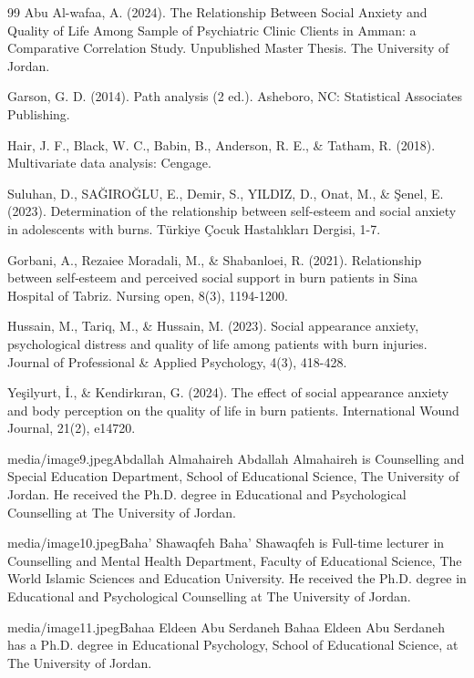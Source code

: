 \documentclass[10pt]{NSP1}
\begin{document}
\begin{thebibliography}{99}
Abu Al-wafaa, A. (2024). The Relationship Between Social Anxiety and Quality of Life Among Sample of Psychiatric Clinic Clients in Amman: a Comparative Correlation Study. Unpublished Master Thesis. The University of Jordan.

Garson, G. D. (2014). Path analysis (2 ed.). Asheboro, NC: Statistical Associates Publishing.

Hair, J. F., Black, W. C., Babin, B., Anderson, R. E., \& Tatham, R. (2018). Multivariate data analysis: Cengage.

Suluhan, D., SAĞIROĞLU, E., Demir, S., YILDIZ, D., Onat, M., \& Şenel, E. (2023). Determination of the relationship between self-esteem and social anxiety in adolescents with burns. Türkiye Çocuk Hastalıkları Dergisi, 1-7.

Gorbani, A., Rezaiee Moradali, M., \& Shabanloei, R. (2021). Relationship between self‐esteem and perceived social support in burn patients in Sina Hospital of Tabriz. Nursing open, 8(3), 1194-1200.

Hussain, M., Tariq, M., \& Hussain, M. (2023). Social appearance anxiety, psychological distress and quality of life among patients with burn injuries. Journal of Professional \& Applied Psychology, 4(3), 418-428.

Yeşilyurt, İ., \& Kendirkıran, G. (2024). The effect of social appearance anxiety and body perception on the quality of life in burn patients. International Wound Journal, 21(2), e14720.



\end{thebibliography}




\begin{biographyps}{media/image9.jpeg}{Abdallah Almahaireh}
Abdallah Almahaireh is Counselling and Special Education Department, School of Educational Science, The University of Jordan. He received the Ph.D. degree in Educational and Psychological Counselling at The University of Jordan.\end{biographyps}

\begin{biographyps}{media/image10.jpeg}{Baha' Shawaqfeh}
Baha' Shawaqfeh is Full-time lecturer in Counselling and Mental Health Department, Faculty of Educational Science, The World Islamic Sciences and Education University. He received the Ph.D. degree in Educational and Psychological Counselling at The University of Jordan.\end{biographyps}

\begin{biographyps}{media/image11.jpeg}{Bahaa Eldeen Abu Serdaneh}
Bahaa Eldeen Abu Serdaneh has a Ph.D. degree in Educational Psychology, School of Educational Science, at The University of Jordan.\end{biographyps}
\end{document}
